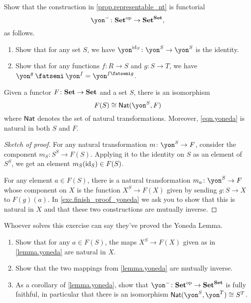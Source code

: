 \documentclass[DynamicalBook]{subfiles}
\begin{document}
\begin{exercise}
Show that the construction in \cref{prop.representable_nt} is functorial
\begin{equation}
\yon^-\colon\smset\op\to\smset^\smset,
\end{equation}
as follows.
\begin{enumerate}
	\item Show that for any set $S$, we have $\yon^{\id_S}\colon\yon^S\to\yon^S$ is the identity.
	\item Show that for any functions $f\colon R\to S$ and $g\colon S\to T$, we have $\yon^g\then\yon^f=\yon^{f\then g}$.
\qedhere
\end{enumerate}
\end{exercise}

\begin{lemma}\label{lemma.yoneda}
Given a functor $F\colon\textbf{Set}\to\textbf{Set}$ and a set $S$, there is an isomorphism
\begin{equation}\label{eqn.yoneda}
F(S)\cong\nat(\yon^S,F)
\end{equation}
where $\mathsf{Nat}$ denotes the set of natural transformations. Moreover, \eqref{eqn.yoneda} is natural in both $S$ and $F$.
\end{lemma}
\begin{proof}[Sketch of proof]
For any natural transformation $m\colon\yon^S\to F$, consider the component $m_S\colon S^S\to F(S)$. Applying it to the identity on $S$ as an element of $S^S$, we get an element $m_S(\mathrm{id}_S)\in F(S)$.

For any element $a\in F(S)$, there is a natural transformation $m_a\colon\yon^S\to F$ whose component on $X$ is the function $X^S\to F(X)$ given by sending $g\colon S\to X$ to $F(g)(a)$. In \cref{exc.finish_proof_yoneda} we ask you to show that this is natural in $X$ and that these two constructions are mutually inverse.
\end{proof}

\begin{exercise}\label{exc.finish_proof_yoneda}
Whoever solves this exercise can say they've proved the Yoneda Lemma.
\begin{enumerate}
	\item Show that for any $a\in F(S)$, the maps $X^S\to F(X)$ given as in \cref{lemma.yoneda} are natural in $X$.
	\item Show that the two mappings from \cref{lemma.yoneda} are mutually inverse.
	\item As a corollary of \cref{lemma.yoneda}, show that $\yon^-\colon\smset\op\to\smset^\smset$ is fully faithful, in particular that there is an isomorphism $\nat(\yon^S,\yon^T)\cong S^T$.
\qedhere
\end{enumerate}
\end{exercise}
\end{document}

